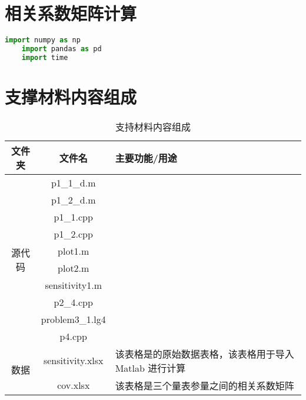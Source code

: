 \documentclass[withoutpreface,bwprint]{cumcmthesis} %
\begin{document}
\newpage
\begin{appendices}

\section{相关系数矩阵计算}

\begin{lstlisting}[language=python]
    import numpy as np
    import pandas as pd
    import time

\end{lstlisting}

\section{支撑材料内容组成}


\begin{table}[h!]
    \centering
    \begin{tabular}{c|c|m{10cm}}
        \toprule
        \textbf{文件夹} & \textbf{文件名} & \textbf{主要功能/用途} \\
        \midrule
        \multirow{10}{*}{源代码} 
        & p1\_1\_d.m &  \\
        \cline{2-3}
        & p1\_2\_d.m &  \\
        \cline{2-3}
        & p1\_1.cpp &  \\
        \cline{2-3}
        & p1\_2.cpp &  \\
        \cline{2-3}
        & plot1.m &  \\
        \cline{2-3}
        & plot2.m &  \\
        \cline{2-3}
        & sensitivity1.m &  \\
        \cline{2-3}
        & p2\_4.cpp & \\
        \cline{2-3}
        & problem3\_1.lg4 &  \\
        \cline{2-3}
        & p4.cpp &  \\
        \midrule
        \multirow{2}{*}{数据} 
        & sensitivity.xlsx & 该表格是的原始数据表格，该表格用于导入 Matlab 进行计算 \\
        \cline{2-3}
        & cov.xlsx & 该表格是三个量表参量之间的相关系数矩阵 \\
        \bottomrule
    \end{tabular}
    \caption{支持材料内容组成}
    \label{tab:supporting_materials}
\end{table}

\end{appendices}
\end{document}
